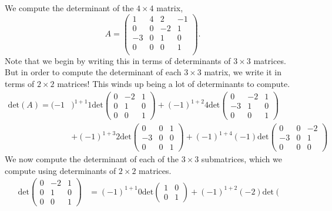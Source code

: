 \documentclass{ximera}
\begin{document}
\begin{example}
We compute the determinant of the $4\times 4$ matrix,
\[
A = \left(\begin{array}{cccc}
1 & 4 & 2 & -1\\
0 & 0 & -2 & 1\\
-3 & 0 & 1 & 0\\
0 & 0 & 0 & 1\\
\end{array}\right).
\]
Note that we begin by writing this in terms of determinants of $3\times 3$ matrices. But in order to compute the determinant of each $3\times 3$ matrix, we write it in terms of $2\times 2$ matrices! This winds up being a lot of determinants to compute.
\begin{align*}
\textrm{det}(A) = (-1&)^{1+1}1\textrm{det}\left(\begin{array}{ccc}
0&-2&1\\
0&1&0\\
0&0&1
\end{array}\right) + (-1)^{1+2}4\textrm{det}\left(\begin{array}{ccc}
0&-2&1\\
-3&1&0\\
0&0&1
\end{array}\right)\\ &+ (-1)^{1+3}2\textrm{det}\left(\begin{array}{ccc}
0&0&1\\
-3&0&0\\
0&0&1 
\end{array}\right)+ (-1)^{1+4}(-1)\textrm{det}\left(\begin{array}{ccc}
0&0&-2\\
-3&0&1\\
0&0&0
\end{array}\right)
\end{align*}
We now compute the determinant of each of the $3\times 3$ submatrices, which we compute using determinants of $2\times 2$ matrices.
\begin{align*}
\textrm{det}\left(\begin{array}{ccc}
0&-2&1\\
0&1&0\\
0&0&1
\end{array}\right) &= (-1)^{1+1}0\textrm{det}\left(\begin{array}{cc}
1&0\\
0&1
\end{array}\right) + (-1)^{1+2}(-2)\textrm{det}\left(\begin{array}{cc}

\end{array}
\end{align*}
\end{example}
\end{document}
